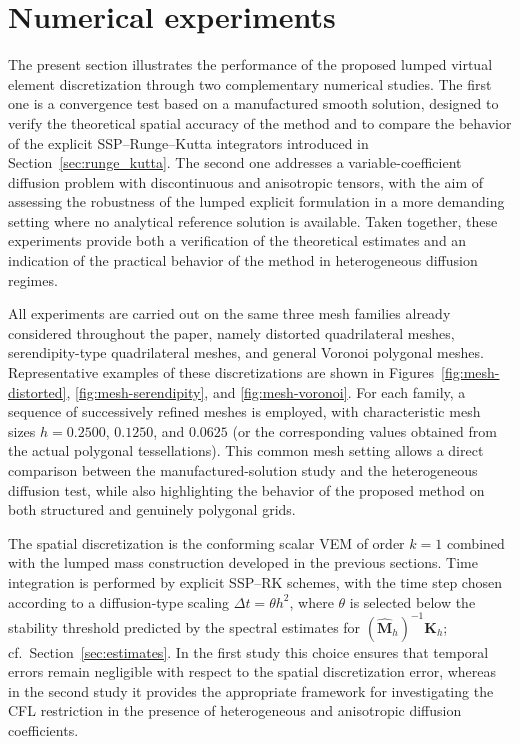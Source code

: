 \documentclass{article}
\newcommand{\K}{\mathbf{K}_h}
\newcommand{\M}{\hat{\mathbf{M}}_h}
\begin{document}
\section{Numerical experiments}
\label{sec:numerical}

The present section illustrates the performance of the proposed lumped virtual element discretization through two complementary numerical studies. The first one is a convergence test based on a manufactured smooth solution, designed to verify the theoretical spatial accuracy of the method and to compare the behavior of the explicit SSP--Runge--Kutta integrators introduced in Section~\ref{sec:runge_kutta}. The second one addresses a variable-coefficient diffusion problem with discontinuous and anisotropic tensors, with the aim of assessing the robustness of the lumped explicit formulation in a more demanding setting where no analytical reference solution is available. Taken together, these experiments provide both a verification of the theoretical estimates and an indication of the practical behavior of the method in heterogeneous diffusion regimes.

All experiments are carried out on the same three mesh families already considered throughout the paper, namely distorted quadrilateral meshes, serendipity-type quadrilateral meshes, and general Voronoi polygonal meshes. Representative examples of these discretizations are shown in Figures~\ref{fig:mesh-distorted}, \ref{fig:mesh-serendipity}, and \ref{fig:mesh-voronoi}. For each family, a sequence of successively refined meshes is employed, with characteristic mesh sizes $h=0.2500$, $0.1250$, and $0.0625$ (or the corresponding values obtained from the actual polygonal tessellations). This common mesh setting allows a direct comparison between the manufactured-solution study and the heterogeneous diffusion test, while also highlighting the behavior of the proposed method on both structured and genuinely polygonal grids.

The spatial discretization is the conforming scalar VEM of order $k=1$ combined with the lumped mass construction developed in the previous sections. Time integration is performed by explicit SSP--RK schemes, with the time step chosen according to a diffusion-type scaling $\Delta t=\theta h^2$, where $\theta$ is selected below the stability threshold predicted by the spectral estimates for $(\M)^{-1}\K$; cf.~Section~\ref{sec:estimates}. In the first study this choice ensures that temporal errors remain negligible with respect to the spatial discretization error, whereas in the second study it provides the appropriate framework for investigating the CFL restriction in the presence of heterogeneous and anisotropic diffusion coefficients.
\end{document}
